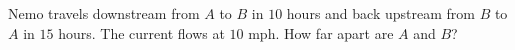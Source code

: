 Nemo travels downstream from $A$ to $B$ in $10$ hours and back upstream from $B$ to $A$ in $15$ hours. The current flows at $10$ mph. How far apart are $A$ and $B$?
